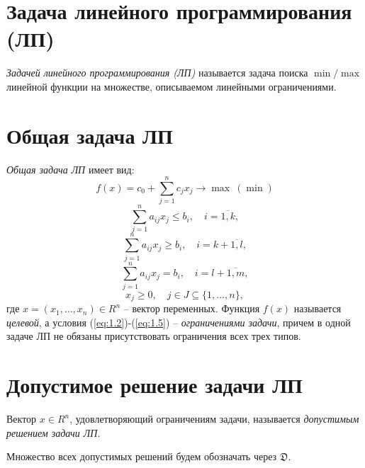 \section{Задача линейного программирования (ЛП)}

\begin{definition}
	\emph{Задачей линейного программирования (ЛП)} называется задача поиска $\min/\max$ линейной функции на множестве, описываемом линейными ограничениями.
\end{definition}

\section{Общая задача ЛП}

\begin{definition}
	\emph{Общая задача ЛП} имеет вид:
	\begin{equation}\label{eq:1.1}
		f(x)=c_{0}+\sum_{j=1}^{n}c_jx_j \rightarrow \max \ (\min)
	\end{equation}
	\begin{equation}\label{eq:1.2}
		\sum_{j=1}^{n}a_{ij}x_{j} \leqslant b_{i}, \quad i = \overline{1,k},
	\end{equation}
	\begin{equation}\label{eq:1.3}
		\sum_{j=1}^{n}a_{ij}x_{j} \geqslant b_{i}, \quad i = k + \overline{1,l},
	\end{equation}
	\begin{equation}\label{eq:1.4}
		\sum_{j=1}^{n}a_{ij}x_{j} = b_{i}, \quad i = l + \overline{1,m},
	\end{equation}
	\begin{equation}\label{eq:1.5}
		x_{j} \geqslant 0, \quad j \in J \subseteq \{1,\ldots,n\},
	\end{equation}
	где $x = (x_1,\ldots,x_n)\in R^n$ -- вектор переменных. Функция $f(x)$ называется \emph{целевой}, а условия (\ref{eq:1.2})-(\ref{eq:1.5}) -- \emph{ограничениями задачи}, причем в одной задаче ЛП не обязаны присутствовать ограничения всех трех типов.
\end{definition}

\section{Допустимое решение задачи ЛП}

\begin{definition}
	Вектор $x \in R^{n}$, удовлетворяющий ограничениям задачи, называется \emph{допустимым решением задачи ЛП}.

	Множество всех допустимых решений будем обозначать через $\mathfrak{D}$.
\end{definition}

